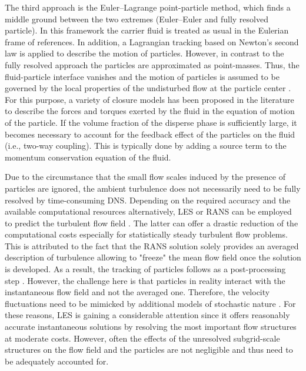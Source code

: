 The third approach is the Euler--Lagrange point-particle method, which
finds a middle ground between the two extremes (Euler--Euler and fully
resolved particle). In this framework the carrier fluid is treated as
usual in the Eulerian frame of references. In addition, a Lagrangian
tracking based on Newton's second law is applied to describe the
motion of particles. However, in contrast to the fully resolved
approach the particles are approximated as point-masses. Thus, the
fluid-particle interface vanishes and the motion of particles is
assumed to be governed by the local properties of the undisturbed flow
at the particle center \citep{maxey83}. For this purpose, a variety of
closure models has been proposed in the literature to describe the
forces and torques exerted by the fluid in the equation of motion of
the particle. If the volume fraction of the disperse phase is
sufficiently large, it becomes necessary to account for the feedback
effect of the particles on the fluid (i.e., two-way coupling). This is
typically done by adding a source term to the momentum conservation
equation of the fluid.

Due to the circumstance that the small flow scales induced by the
presence of particles are ignored, the ambient turbulence does not
necessarily need to be fully resolved by time-consuming DNS. Depending
on the required accuracy and the available computational resources
alternatively, LES or RANS can be employed to predict the turbulent
flow field \citep{balachandar2009scaling,kuerten2016}. The latter can
offer a drastic reduction of the computational costs especially for
statistically steady turbulent flow problems. This is attributed to
the fact that the RANS solution solely provides an averaged
description of turbulence allowing to "freeze" the mean flow field
once the solution is developed. As a result, the tracking of particles
follows as a post-processing step \citep{kuerten2016}.  However, the
challenge here is that particles in reality interact with the
instantaneous flow field and not the averaged one.  Therefore, the
velocity fluctuations need to be mimicked by additional models of
stochastic nature \citep{sommerfeld2008}. For these reasons, LES is
gaining a considerable attention since it offers reasonably accurate
instantaneous solutions by resolving the most important flow
structures at moderate costs.  However, often the effects of the
unresolved subgrid-scale structures on the flow field and the
particles are not negligible and thus need to be adequately accounted
for.

